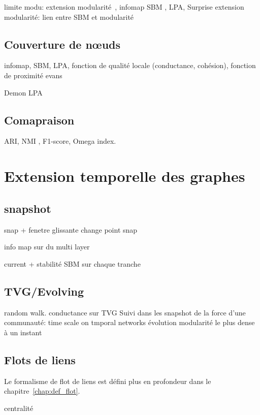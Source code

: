 limite modu: \cite{Fortunato2007} extension \cite{Reichardt2006, Delvenne2010}
modularité~\cite{Newman2004}, infomap SBM \cite{Holland1983a}, LPA, Surprise
extension modularité: \cite{Delvenne2010}
lien entre SBM et modularité\cite{Newman2016}
\subsection{Couverture de n\oe uds}
\label{subsec:cover}
infomap\cite{Esquivel2011}, SBM, LPA, fonction de qualité locale (conductance, cohésion), fonction de proximité
\cite{Evans2009} evans

Demon \cite{Coscia2012c} LPA
\cite{Danisch2012, Kanawati2014, Xie2013}
\subsection{Comapraison}
ARI, NMI \cite{Danon2005}, F1-score, Omega index.


\section{Extension temporelle des graphes}
\label{sec:intro_extension_temporelle}
\subsection{snapshot}
snap + fenetre glissante \cite{de2016detection} change point snap

\cite{DeDomenico2014} info map sur du multi layer

\cite{Chakrabarti2006,Chen2013} current + stabilité
\cite{Corneli2016} SBM sur chaque tranche
\subsection{TVG/Evolving}
\cite{Figueiredo2012} random walk.
\cite{Cazabet2010} conductance sur TVG
Suivi dans les snapshot de la force d'une communauté: \cite{Du2015}
\cite{Caceres2013} time scale on tmporal networks 
\cite{Cordeiro2016} évolution modularité
\cite{Epasto2015} le plus dense à un instant
\subsection{Flots de liens}


Le formalisme de flot de liens est défini plus en profondeur dans le chapitre~\ref{chap:def_flot}.

centralité \cite{Costa2015}